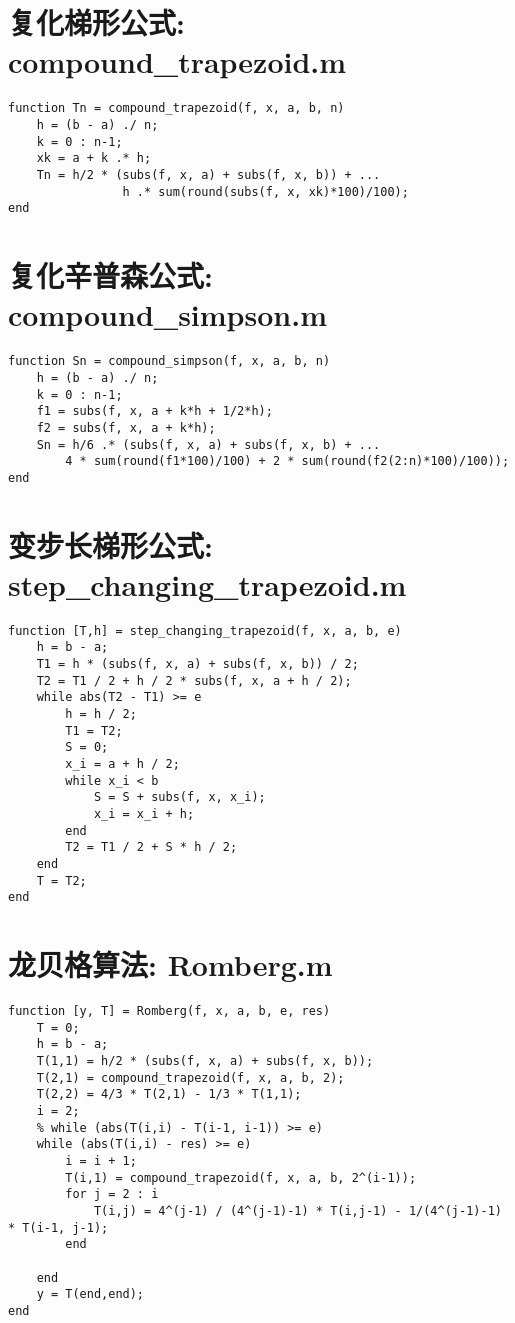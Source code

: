 \section*{复化梯形公式: compound\_trapezoid.m}
\lstset{language=Matlab}

\begin{lstlisting}
function Tn = compound_trapezoid(f, x, a, b, n)
    h = (b - a) ./ n;
    k = 0 : n-1;
    xk = a + k .* h;
    Tn = h/2 * (subs(f, x, a) + subs(f, x, b)) + ...
                h .* sum(round(subs(f, x, xk)*100)/100);
end
\end{lstlisting}

\section*{复化辛普森公式: compound\_simpson.m}
\lstset{language=Matlab}
\begin{lstlisting}
function Sn = compound_simpson(f, x, a, b, n)
    h = (b - a) ./ n;
    k = 0 : n-1;
    f1 = subs(f, x, a + k*h + 1/2*h);
    f2 = subs(f, x, a + k*h);
    Sn = h/6 .* (subs(f, x, a) + subs(f, x, b) + ...
        4 * sum(round(f1*100)/100) + 2 * sum(round(f2(2:n)*100)/100));
end
\end{lstlisting}

\section*{变步长梯形公式: step\_changing\_trapezoid.m}
\lstset{language=Matlab}
\begin{lstlisting}
function [T,h] = step_changing_trapezoid(f, x, a, b, e)
    h = b - a;
    T1 = h * (subs(f, x, a) + subs(f, x, b)) / 2;
    T2 = T1 / 2 + h / 2 * subs(f, x, a + h / 2);
    while abs(T2 - T1) >= e
        h = h / 2;
        T1 = T2;
        S = 0;
        x_i = a + h / 2;
        while x_i < b
            S = S + subs(f, x, x_i);
            x_i = x_i + h;
        end
        T2 = T1 / 2 + S * h / 2;
    end
    T = T2;
end
\end{lstlisting}

\section*{龙贝格算法: Romberg.m}
\lstset{language=Matlab}
\begin{lstlisting}
function [y, T] = Romberg(f, x, a, b, e, res)
    T = 0;
    h = b - a;
    T(1,1) = h/2 * (subs(f, x, a) + subs(f, x, b));
    T(2,1) = compound_trapezoid(f, x, a, b, 2);
    T(2,2) = 4/3 * T(2,1) - 1/3 * T(1,1);
    i = 2;
    % while (abs(T(i,i) - T(i-1, i-1)) >= e)
    while (abs(T(i,i) - res) >= e)
        i = i + 1;
        T(i,1) = compound_trapezoid(f, x, a, b, 2^(i-1));
        for j = 2 : i
            T(i,j) = 4^(j-1) / (4^(j-1)-1) * T(i,j-1) - 1/(4^(j-1)-1) * T(i-1, j-1);
        end

    end
    y = T(end,end);
end
\end{lstlisting}

